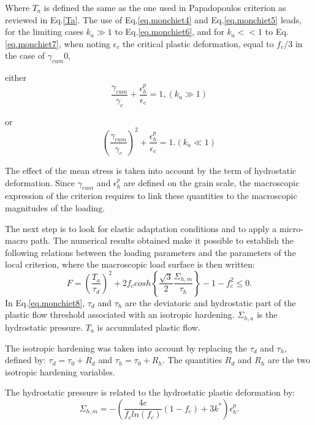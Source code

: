 Where $T_a$ is defined the same as the one used in Papadopoulos criterion as reviewed in Eq.\eqref{Ta}. The use of Eq.\eqref{eq.monchiet4} and Eq.\eqref{eq.monchiet5} leads, for the limiting cases $k_a \gg 1$ to Eq.\eqref{eq.monchiet6}, and for $k_a << 1$ to Eq.\eqref{eq.monchiet7}, when noting $\epsilon_c$ the critical plastic deformation, equal to $f_c / 3$ in the case of $\gamma_{cum} 0$, 

either 
\begin{equation}
\dfrac{\gamma_{cum}}{\gamma_{c}}+\dfrac{\epsilon_h^p}{\epsilon_c}=1, \left( k_a \gg 1\right) 
\label{eq.monchiet6}
\end{equation}

or
\begin{equation}
\left( \dfrac{\gamma_{cum}}{\gamma_{c}}\right) ^2+\dfrac{\epsilon_h^p}{\epsilon_c}=1. \left( k_a \ll 1\right) 
\label{eq.monchiet7}
\end{equation}

The effect of the mean stress is taken into account by the term of hydrostatic deformation. Since $\gamma_{cum}$ and $\epsilon_h^p$ are defined on the grain scale, the macroscopic expression of the criterion requires to link these quantities to the macroscopic magnitudes of the loading.

The next step is to look for elastic adaptation conditions and to apply a micro-macro path. The numerical results obtained make it possible to establish the following relations between the loading parameters and the parameters of the local criterion, where the macroscopic  load surface is then written:
\begin{equation}
F=\left( \dfrac{T_a}{\tau_d}\right) ^2+2f_ccosh\left\lbrace\dfrac{\sqrt{3}}{2}\dfrac{\Sigma_{h,m}}{\tau_h} \right\rbrace-1-f_c^2\leqslant 0.
\label{eq.monchiet8}
\end{equation}
In Eq.\eqref{eq.monchiet8}, $\tau_d$ and $\tau_h$ are the deviatoric and hydrostatic part of the plastic flow threshold associated with an isotropic hardening. $\Sigma_{h,a}$ is the hydrostatic pressure. $T_a$ is accumulated plastic flow.

The isotropic hardening was taken into account by replacing the
$\tau_d$ and $\tau_h$, defined by: $\tau_d = \tau_0 + R_d$ and $\tau_h = \tau_0 + R_h$. The quantities $R_d$ and $R_h$ are the two isotropic hardening variables. 

The hydrostatic pressure is related to the hydrostatic plastic deformation by:
\begin{equation}
\Sigma_{h,m}=-\left( \dfrac{4c}{f_cln(f_c)}\left( 1-f_c\right)+3k^{\ast} \right) \epsilon_h^p.
\label{eq.monchiet9}
\end{equation}



